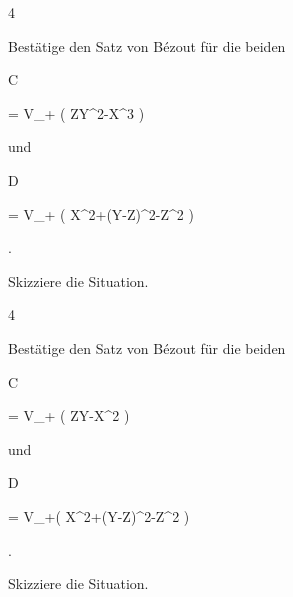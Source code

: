 {} {}



{4}

{


Bestätige
den Satz von Bézout
für die beiden


\mavergleichskette

{\vergleichskette

{ C
}

{ = }{ V_+ \left(  ZY^2-X^3  \right)
}

{  }{
}

{    }{
}

{   }{
}

}
{}{}{}
und


\mavergleichskette

{\vergleichskette

{ D
}

{ = }{ V_+ \left(  X^2+(Y-Z)^2-Z^2  \right)
}

{  }{
}

{    }{
}

{   }{
}

}
{}{}{.}


}

{Skizziere die Situation.} {}



{4}

{


Bestätige
den Satz von Bézout
für die beiden


\mavergleichskette

{\vergleichskette

{C
}

{ = }{ V_+ \left(  ZY-X^2  \right)
}

{  }{
}

{    }{
}

{   }{
}

}
{}{}{}
und


\mavergleichskette

{\vergleichskette

{D
}

{ = }{ V_+\left(  X^2+(Y-Z)^2-Z^2  \right)
}

{  }{
}

{    }{
}

{   }{
}

}
{}{}{.}


}

{Skizziere die Situation.} {}



